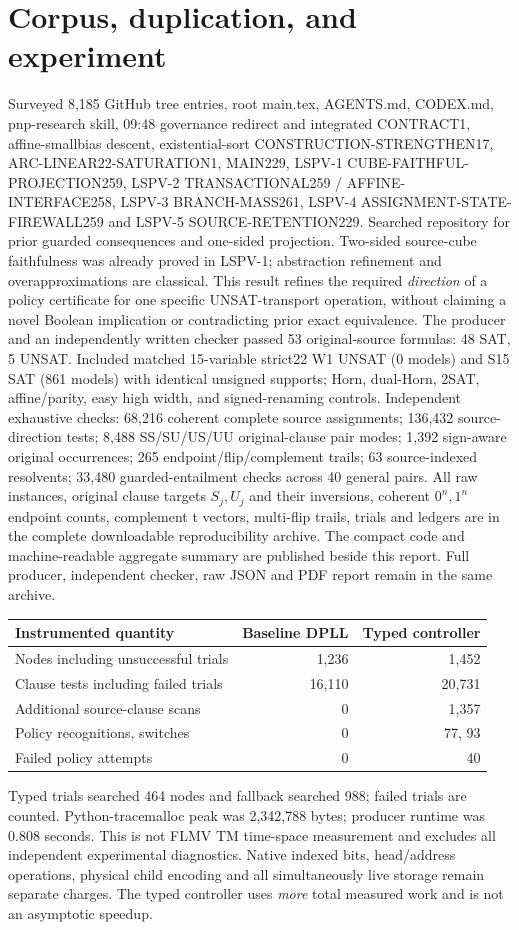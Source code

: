 \documentclass[11pt]{article}
\begin{document}
\section{Corpus, duplication, and experiment}
Surveyed 8,185 GitHub tree entries, root main.tex, AGENTS.md, CODEX.md, pnp-research skill, 09:48 governance redirect and integrated CONTRACT1, affine-smallbias descent, existential-sort CONSTRUCTION-STRENGTHEN17, ARC-LINEAR22-SATURATION1, MAIN229, LSPV-1 CUBE-FAITHFUL-PROJECTION259, LSPV-2 TRANSACTIONAL259 / AFFINE-INTERFACE258, LSPV-3 BRANCH-MASS261, LSPV-4 ASSIGNMENT-STATE-FIREWALL259 and LSPV-5 SOURCE-RETENTION229. Searched repository for prior guarded consequences and one-sided projection. Two-sided source-cube faithfulness was already proved in LSPV-1; abstraction refinement and overapproximations are classical. This result refines the required \emph{direction} of a policy certificate for one specific UNSAT-transport operation, without claiming a novel Boolean implication or contradicting prior exact equivalence.
The producer and an independently written checker passed 53 original-source formulas: 48 SAT, 5 UNSAT. Included matched 15-variable strict22 W1 UNSAT (0 models) and S15 SAT (861 models) with identical unsigned supports; Horn, dual-Horn, 2SAT, affine/parity, easy high width, and signed-renaming controls. Independent exhaustive checks: 68,216 coherent complete source assignments; 136,432 source-direction tests; 8,488 SS/SU/US/UU original-clause pair modes; 1,392 sign-aware original occurrences; 265 endpoint/flip/complement trails; 63 source-indexed resolvents; 33,480 guarded-entailment checks across 40 general pairs. All raw instances, original clause targets $S_j,U_j$ and their inversions, coherent $0^n,1^n$ endpoint counts, complement t vectors, multi-flip trails, trials and ledgers are in the complete downloadable reproducibility archive. The compact code and machine-readable aggregate summary are published beside this report. Full producer, independent checker, raw JSON and PDF report remain in the same archive.
\begin{center}\begin{tabular}{lrr}\toprule
Instrumented quantity & Baseline DPLL & Typed controller\\\midrule
Nodes including unsuccessful trials &1,236&1,452\\
Clause tests including failed trials &16,110&20,731\\
Additional source-clause scans &0&1,357\\
Policy recognitions, switches &0&77, 93\\
Failed policy attempts &0&40\\\bottomrule
\end{tabular}\end{center}
Typed trials searched 464 nodes and fallback searched 988; failed trials are counted. Python-tracemalloc peak was 2,342,788 bytes; producer runtime was 0.808 seconds. This is not FLMV TM time-space measurement and excludes all independent experimental diagnostics. Native indexed bits, head/address operations, physical child encoding and all simultaneously live storage remain separate charges. The typed controller uses \emph{more} total measured work and is not an asymptotic speedup.
\end{document}
